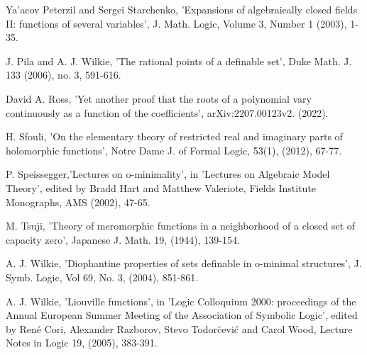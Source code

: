 \documentclass[12pt,nodate]{article}
\begin{document}
 
 \vspace{1mm}
 
 \noindent
 [PS2] Ya'acov Peterzil and Sergei Starchenko, 'Expansions of algebraically closed fields II: functions of several variables', J. Math. Logic, Volume 3, Number 1 (2003), 1-35.
 
 \vspace{1mm}
 
 \noindent
 [PW] J. Pila and A. J. Wilkie, 'The rational points of a definable set', Duke Math. J. 133 (2006), no. 3, 591-616.
 
 \vspace{1mm}
 
 \noindent
 [R] David A. Ross, 'Yet another proof that the roots of a polynomial vary continuously as a function of the coefficients', arXiv:2207.00123v2. (2022).
 
 \vspace{1mm}
 
 \noindent
 [S] H. Sfouli, 'On the elementary theory of restricted real and imaginary parts of holomorphic functions', Notre Dame J. of Formal Logic, 53(1), (2012), 67-77.
 
 \vspace{1mm}
 
 \noindent
 [Sp] P. Speissegger,'Lectures on o-minimality', in 'Lectures on Algebraic Model Theory', edited by Bradd Hart and Matthew Valeriote, Fields Institute Monographs, AMS (2002), 47-65.
 
 \vspace{1mm}
 
 
 \noindent
 [T] M. Tsuji, 'Theory of meromorphic functions in a neighborhood of a closed set of capacity zero', Japanese J. Math. 19, (1944), 139-154.
 
 \vspace{1mm}
 
 \noindent
 [W1] A. J. Wilkie, 'Diophantine properties of sets definable in o-minimal structures', J. Symb. Logic, Vol 69, No. 3, (2004), 851-861.
 
 \vspace{1mm}
 

 \noindent
[W2] A. J. Wilkie, 'Liouville functions', in 'Logic Colloquium 2000: proceedings of the Annual European Summer Meeting of the Association of Symbolic Logic', edited by Ren\'{e} Cori, Alexander Razborov, Stevo Todor\u{c}evi\'{c} and Carol Wood, Lecture Notes in Logic 19, (2005), 383-391.
 
 
 \vspace{1mm}
 
\end{document}
